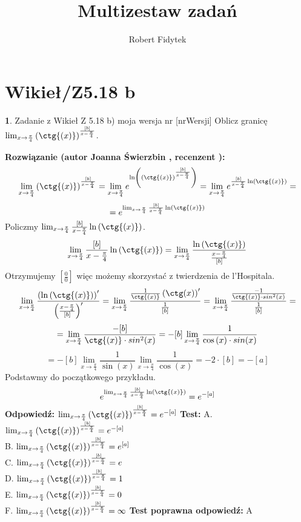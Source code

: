 \documentclass[12pt, a4paper]{article}
\title{Multizestaw zadań}
\author{Robert Fidytek}
\date{}
\theoremstyle{definition} %
\newtheorem{zad}{}
\newcommand{\kategoria}[1]{\section{#1}} %
\newcommand{\zadStart}[1]{\begin{zad}#1\newline} %
\newcommand{\zadStop}{\end{zad}}   %
\newcommand{\rozwStart}[2]{\noindent \textbf{Rozwiązanie (autor #1 , recenzent #2): }\newline} %
\newcommand{\rozwStop}{\newline}                                            %
\newcommand{\odpStart}{\noindent \textbf{Odpowiedź:}\newline}    %
\newcommand{\odpStop}{\newline}                                             %
\newcommand{\testStart}{\noindent \textbf{Test:}\newline} %
\newcommand{\testStop}{\newline} %
\newcommand{\kluczStart}{\noindent \textbf{Test poprawna odpowiedź:}\newline} %
\newcommand{\kluczStop}{\newline} %
\begin{document}
\maketitle


\kategoria{Wikieł/Z5.18 b}
\zadStart{Zadanie z Wikieł Z 5.18 b) moja wersja nr [nrWersji]}
Oblicz granicę $\lim_{x \rightarrow \frac{\pi}{4}} \left(\ctg{(x)} \right)^{\frac{[b]}{x-\frac{\pi}{4}}}$.
\zadStop
\rozwStart{Joanna Świerzbin}{}
$$ \lim_{x \rightarrow \frac{\pi}{4}} \left(\ctg{(x)} \right)^{\frac{[b]}{x-\frac{\pi}{4}}} = \lim_{x \rightarrow \frac{\pi}{4}} e^{\ln \left(\left(\ctg{(x)} \right)^{\frac{[b]}{x-\frac{\pi}{4}}}\right)}= \lim_{x \rightarrow \frac{\pi}{4}} e^{{\frac{[b]}{x-\frac{\pi}{4}}}\ln \left(\ctg{(x)} \right)}=$$
$$=e^{\lim_{x \rightarrow \frac{\pi}{4}}{\frac{[b]}{x-\frac{\pi}{4}}}\ln \left(\ctg{(x)} \right)}$$
Policzmy $ {\lim_{x \rightarrow \frac{\pi}{4}}{\frac{[b]}{x-\frac{\pi}{4}}}\ln \left(\ctg{(x)} \right)}$.
$${\lim_{x \rightarrow \frac{\pi}{4}}{\frac{[b]}{x-\frac{\pi}{4}}}\ln \left(\ctg{(x)} \right)} = \lim_{x \rightarrow \frac{\pi}{4}} \frac{\ln\left(\ctg{(x)} \right)}{\frac{x-\frac{\pi}{4}}{[b]}}$$
Otrzymujemy $ \left[ \frac{0}{0} \right] $ więc możemy skorzystać z twierdzenia de l'Hospitala.
$$\lim_{x \rightarrow \frac{\pi}{4}} \frac{\left(\ln\left(\ctg{(x)} \right)\right)'}{\left(\frac{x-\frac{\pi}{4}}{[b]}\right)'} = \lim_{x \rightarrow \frac{\pi}{4}} \frac{\frac{1}{\ctg{(x)}}\left(\ctg(x)\right)'}{\frac{1}{[b]}} = \lim_{x \rightarrow \frac{\pi}{4}} \frac{\frac{-1}{\ctg{(x)}\cdot sin^2(x)}}{\frac{1}{[b]}}=$$
$$= \lim_{x \rightarrow \frac{\pi}{4}} \frac{-[b]}{\ctg{(x)}\cdot sin^2(x)}= -[b] \lim_{x \rightarrow \frac{\pi}{4}} \frac{1}{\cos{(x)}\cdot sin(x)}$$
$$ =-[b] \lim_{x \rightarrow \frac{\pi}{4}} \frac{1}{\sin( x )}  \lim_{x \rightarrow \frac{\pi}{4}} \frac{1}{\cos{(x)}}=- 2 \cdot [b] = - [a] $$
Podstawmy do początkowego przykładu.
$$e^{\lim_{x \rightarrow \frac{\pi}{4}}{\frac{[b]}{x-\frac{\pi}{4}}}\ln \left(\ctg{(x)} \right)} = e^{-[a]} $$
\rozwStop
\odpStart
$ \lim_{x \rightarrow \frac{\pi}{4}} \left(\ctg{(x)} \right)^{\frac{[b]}{x-\frac{\pi}{4}}} = e^{-[a]} $
\odpStop
\testStart
A. $\lim_{x \rightarrow \frac{\pi}{4}} \left(\ctg{(x)} \right)^{\frac{[b]}{x-\frac{\pi}{4}}} = e^{-[a]}$\\
B. $\lim_{x \rightarrow \frac{\pi}{4}} \left(\ctg{(x)} \right)^{\frac{[b]}{x-\frac{\pi}{4}}} = e^{[a]}$\\
C. $\lim_{x \rightarrow \frac{\pi}{4}} \left(\ctg{(x)} \right)^{\frac{[b]}{x-\frac{\pi}{4}}} = e$\\
D. $\lim_{x \rightarrow \frac{\pi}{4}} \left(\ctg{(x)} \right)^{\frac{[b]}{x-\frac{\pi}{4}}} = 1$\\
E. $\lim_{x \rightarrow \frac{\pi}{4}} \left(\ctg{(x)} \right)^{\frac{[b]}{x-\frac{\pi}{4}}} = 0$\\
F. $\lim_{x \rightarrow \frac{\pi}{4}} \left(\ctg{(x)} \right)^{\frac{[b]}{x-\frac{\pi}{4}}} = \infty$
\testStop
\kluczStart
A
\kluczStop
\end{document}
